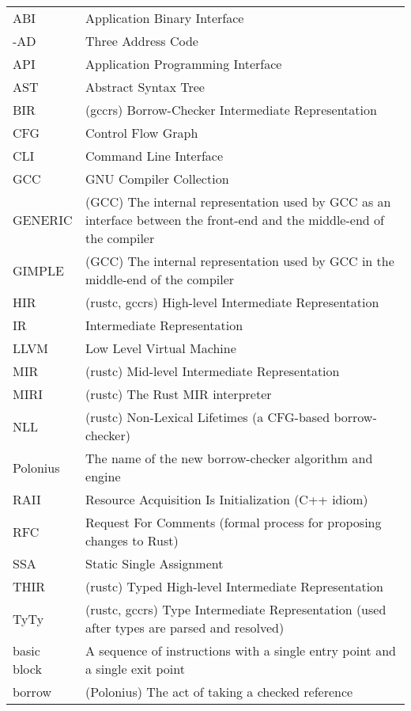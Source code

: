 \documentclass[
  11pt,
  twoside]{report}
\begin{document}
\begin{longtable}[]{@{}
  >{\raggedright\arraybackslash}p{}
  >{\raggedright\arraybackslash}p{}@{}}
\toprule\noalign{}
\endhead
\bottomrule\noalign{}
\endlastfoot
ABI & Application Binary Interface \\
3-AD & Three Address Code \\
API & Application Programming Interface \\
AST & Abstract Syntax Tree \\
BIR & (gccrs) Borrow-Checker Intermediate Representation \\
CFG & Control Flow Graph \\
CLI & Command Line Interface \\
GCC & GNU Compiler Collection \\
GENERIC & (GCC) The internal representation used by GCC as an interface
between the front-end and the middle-end of the compiler \\
GIMPLE & (GCC) The internal representation used by GCC in the middle-end
of the compiler \\
HIR & (rustc, gccrs) High-level Intermediate Representation \\
IR & Intermediate Representation \\
LLVM & Low Level Virtual Machine \\
MIR & (rustc) Mid-level Intermediate Representation \\
MIRI & (rustc) The Rust MIR interpreter \\
NLL & (rustc) Non-Lexical Lifetimes (a CFG-based borrow-checker) \\
Polonius & The name of the new borrow-checker algorithm and engine \\
RAII & Resource Acquisition Is Initialization (C++ idiom) \\
RFC & Request For Comments (formal process for proposing changes to
Rust) \\
SSA & Static Single Assignment \\
THIR & (rustc) Typed High-level Intermediate Representation \\
TyTy & (rustc, gccrs) Type Intermediate Representation (used after types
are parsed and resolved) \\
basic block & A sequence of instructions with a single entry point and a
single exit point \\
borrow & (Polonius) The act of taking a checked reference \\

\end{longtable}
\end{document}
